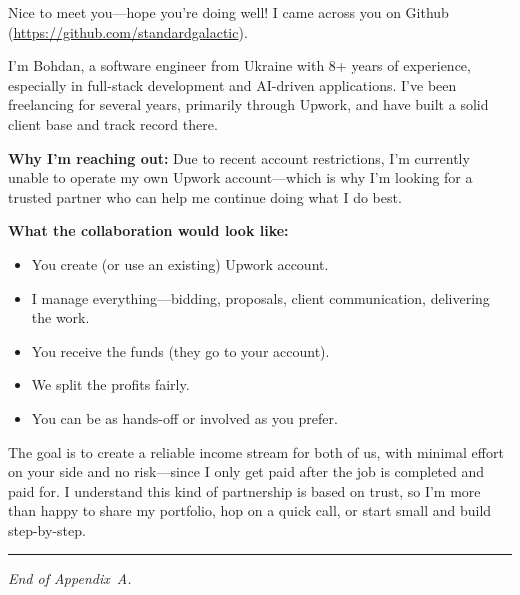 \documentclass[11pt]{article}
\begin{document}
\begin{msgbox}
Nice to meet you---hope you're doing well! I came across you on Github
(\url{https://github.com/standardgalactic}).

I'm Bohdan, a software engineer from Ukraine with 8+ years of experience,
especially in full-stack development and AI-driven applications. I've been
freelancing for several years, primarily through Upwork, and have built a solid
client base and track record there.

\smallskip\noindent\textbf{Why I'm reaching out:} Due to recent account
restrictions, I'm currently unable to operate my own Upwork account---which is
why I'm looking for a trusted partner who can help me continue doing what I do
best.

\smallskip\noindent\textbf{What the collaboration would look like:}
\begin{itemize}[nosep, leftmargin=1.5em]
  \item You create (or use an existing) Upwork account.
  \item I manage everything---bidding, proposals, client communication,
  delivering the work.
  \item You receive the funds (they go to your account).
  \item We split the profits fairly.
  \item You can be as hands-off or involved as you prefer.
\end{itemize}

The goal is to create a reliable income stream for both of us, with minimal
effort on your side and no risk---since I only get paid after the job is
completed and paid for. I understand this kind of partnership is based on trust,
so I'm more than happy to share my portfolio, hop on a quick call, or start
small and build step-by-step.
\end{msgbox}

\bigskip

\noindent\rule{\linewidth}{0.4pt}

\medskip
\noindent\textit{End of Appendix~A.}
\end{document}
